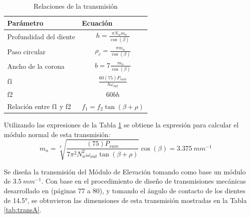 \begin{table}[H]
	\centering
	\caption{Relaciones de la transmisión}
	\begin{tabular}{|l|c|}
		\hline
		\textbf{Parámetro} & \multicolumn{1}{l|}{\textbf{Ecuación}} \\
		\hline \hline
		Profundidad del diente & $ h=\frac{\pi N_w m_n}{\cos(\beta)} $ \\
		\hline
		Paso circular & $ \rho_c=\frac{\pi m_n}{\cos(\beta)} $ \\
		\hline
		Ancho de la corona & $ b=7\frac{m_n}{\cos(\beta)} $ \\
		\hline
		f1 & $ \frac{60(75)P_{sum}}{h \omega_{out}} $ \\
		\hline
		f2 & $ 60bh $ \\
		\hline
		Relación entre f1 y f2 & $ f_1=f_2\tan(\beta+\rho) $ \\
		\hline
	\end{tabular}%
	\label{tab:relA}%
\end{table}%

Utilizando las expresiones de la Tabla \ref{tab:relA} se obtiene la expresión para calcular el módulo normal de esta transmisión:
\begin{equation}
	m_n=\sqrt[3]{\frac{(75)P_{sum}}{7 \pi^2 N^2_w \omega_{out} \tan(\beta+\rho)}}\cos(\beta)=3.375\ mm^{-1}
\end{equation}

Se diseña la transmisión del Módulo de Elevación tomando como base un módulo de $ 3.5\ mm^{-1} $. Con base en el procedimiento de diseño de transmisiones mecánicas desarrollado en \cite{DDA10} (páginas 77 a 80), y tomando el ángulo de contacto de los dientes de 14.5°, se obtuvieron las dimensiones de esta transmisión mostradas en la Tabla \ref{tab:transA}.


